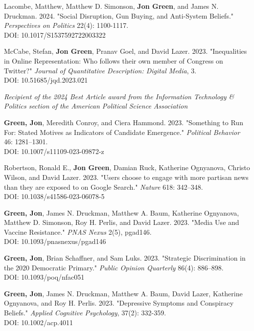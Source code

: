 \documentclass[letterpaper]{article}
\renewenvironment{itemize}{
  \begin{list}{}{
    \setlength{\leftmargin}{1.5em}
  }
}{
  \end{list}
}
\begin{document}
\begin{etaremune}
\item Lacombe, Matthew, Matthew D. Simonson, \textbf{Jon Green}, and James N. Druckman. 2024. "Social Disruption, Gun Buying, and Anti-System Beliefs." \textit{Perspectives on Politics} 22(4): 1100-1117. \\
DOI: 10.1017/S1537592722003322

\item McCabe, Stefan, \textbf{Jon Green}, Pranav Goel, and David Lazer. 2023. "Inequalities in Online Representation: Who follows their own member of Congress on Twitter?" \textit{Journal of Quantitative Description: Digital Media}, 3. \\
DOI: 10.51685/jqd.2023.021
\begin{itemize}
\item \textit{Recipient of the 2024 Best Article award from the Information Technology \& Politics section of the American Political Science Association}
\end{itemize}

\item \textbf{Green, Jon}, Meredith Conroy, and Ciera Hammond. 2023. "Something to Run For: Stated Motives as Indicators of Candidate Emergence." \textit{Political Behavior} 46: 1281–1301.\\
DOI: 10.1007/s11109-023-09872-z

\item Robertson, Ronald E., \textbf{Jon Green}, Damian Ruck, Katherine Ognyanova, Christo Wilson, and David Lazer. 2023. "Users choose to engage with more partisan news than they are exposed to on Google Search." \textit{Nature} 618: 342–348.\\
DOI: 10.1038/s41586-023-06078-5

\item \textbf{Green, Jon}, James N. Druckman, Matthew A. Baum, Katherine Ognyanova, Matthew D. Simonson, Roy H. Perlis, and David Lazer. 2023. "Media Use and Vaccine Resistance." \textit{PNAS Nexus} 2(5), pgad146.\\
DOI: 10.1093/pnasnexus/pgad146

\item \textbf{Green, Jon}, Brian Schaffner, and Sam Luks. 2023. "Strategic Discrimination in the 2020 Democratic Primary." \textit{Public Opinion Quarterly} 86(4): 886–898.\\
DOI: 10.1093/poq/nfac051

\item \textbf{Green, Jon}, James N. Druckman, Matthew A. Baum, David Lazer, Katherine Ognyanova, and Roy H. Perlis. 2023. "Depressive Symptoms and Conspiracy Beliefs." \textit{Applied Cognitive Psychology}, 37(2): 332-359. \\
DOI: 10.1002/acp.4011


\end{etaremune}
\end{document}
